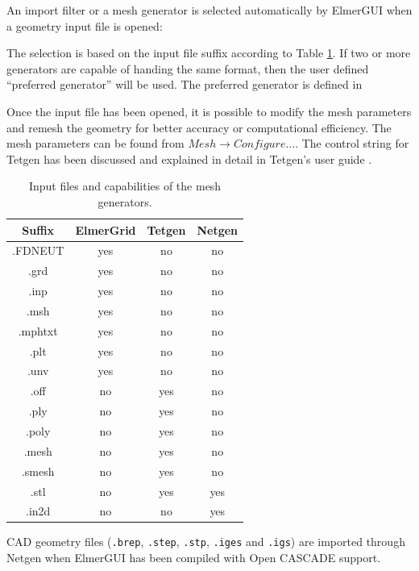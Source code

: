 An import filter or a mesh generator is selected automatically by ElmerGUI when a geometry
input file is opened:


The selection is based on the input file suffix according to Table \ref{table:inputfiles}. If two or more
generators are capable of handing the same format, then the user defined ``preferred
generator'' will be used. The preferred generator is defined in


Once the input file has been opened, it is possible to modify the mesh parameters
and remesh the geometry for better accuracy or computational efficiency. The mesh parameters
can be found from $Mesh \rightarrow Configure...$. The control string for Tetgen
has been discussed and explained in detail in Tetgen's user guide \cite{TetgenHome}.

\begin{table}
	\caption{Input files and capabilities of the mesh generators.}
	\label{table:inputfiles}
	\begin{center}
		\begin{tabular}{|c|c|c|c|}
		\hline
		 Suffix & ElmerGrid & Tetgen & Netgen \\
		\hline 
		.FDNEUT & yes & no & no \\
		.grd  & yes & no & no \\
		.inp & yes & no & no \\
		.msh & yes & no & no \\
		.mphtxt & yes & no & no \\
		.plt & yes & no & no \\
		.unv & yes & no & no \\
		.off & no & yes & no \\
		.ply & no & yes & no \\
		.poly & no & yes & no \\
		.mesh & no & yes & no \\
		.smesh & no & yes & no \\
		.stl  & no & yes & yes \\
		.in2d & no & no & yes \\
		\hline
		\end{tabular}
	\end{center}
\end{table}

CAD geometry files ({\tt .brep}, {\tt .step}, {\tt .stp}, {\tt .iges} and {\tt .igs}) are
imported through Netgen when ElmerGUI has been compiled with Open CASCADE support.

